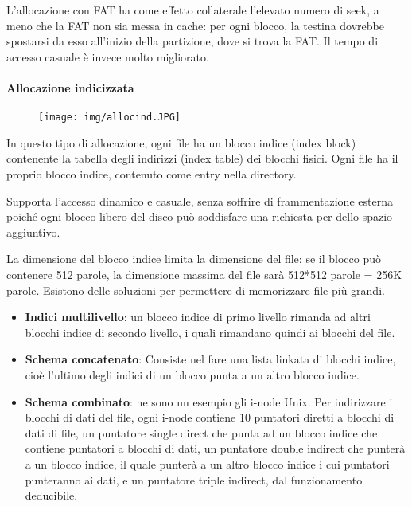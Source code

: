 \documentclass[a4paper]{article}
\begin{document}
L'allocazione con FAT ha come effetto collaterale l'elevato numero di seek, a meno che la FAT non sia messa in cache: per ogni blocco, la testina dovrebbe spostarsi da esso all'inizio della partizione, dove si trova la FAT. Il tempo di accesso casuale è invece molto migliorato.

\paragraph{Allocazione indicizzata}
\begin{figure}[h!]
    \centering
    \texttt{[image: img/allocind.JPG]}
\end{figure}
In questo tipo di allocazione, ogni file ha un blocco indice (index block) contenente la tabella degli indirizzi (index table) dei blocchi fisici. Ogni file ha il proprio blocco indice, contenuto come entry nella directory.

Supporta l'accesso dinamico e casuale, senza soffrire di frammentazione esterna poiché ogni blocco libero del disco può soddisfare una richiesta per dello spazio aggiuntivo.

La dimensione del blocco indice limita la dimensione del file: se il blocco può contenere 512 parole, la dimensione massima del file sarà 512*512 parole = 256K parole. Esistono delle soluzioni per permettere di memorizzare file più grandi.
\begin{itemize}
    \item \textbf{Indici multilivello}: un blocco indice di primo livello rimanda ad altri blocchi indice di secondo livello, i quali rimandano quindi ai blocchi del file.
    \item \textbf{Schema concatenato}: Consiste nel fare una lista linkata di blocchi indice, cioè l'ultimo degli indici di un blocco punta a un altro blocco indice.
    \item \textbf{Schema combinato}: ne sono un esempio gli i-node Unix. Per indirizzare i blocchi di dati del file, ogni i-node contiene 10 puntatori diretti a blocchi di dati di file, un puntatore single direct che punta ad un blocco indice che contiene puntatori a blocchi di dati, un puntatore double indirect che punterà a un blocco indice, il quale punterà a un altro blocco indice i cui puntatori punteranno ai dati, e un puntatore triple indirect, dal funzionamento deducibile.
\end{itemize}
\end{document}
